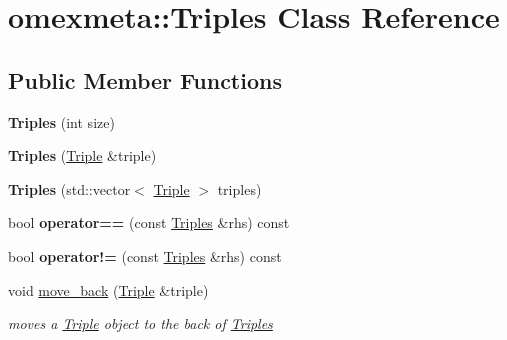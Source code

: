 \hypertarget{classomexmeta_1_1Triples}{}\section{omexmeta\+:\+:Triples Class Reference}
\label{classomexmeta_1_1Triples}
\subsection*{Public Member Functions}
\begin{DoxyCompactItemize}
\item 
\mbox{\label{classomexmeta_1_1Triples_a32ea34c1fd3bfe9887c2221377392efe}} 
{\bfseries Triples} (int size)
\item 
\mbox{\label{classomexmeta_1_1Triples_a733eea0f6a2c206eb96771bc7a8cb430}} 
{\bfseries Triples} (\hyperlink{classomexmeta_1_1Triple}{Triple} \&triple)
\item 
\mbox{\label{classomexmeta_1_1Triples_a71a3ff7b185a5420eabd9bf4e9637196}} 
{\bfseries Triples} (std\+::vector$<$ \hyperlink{classomexmeta_1_1Triple}{Triple} $>$ triples)
\item 
\mbox{\label{classomexmeta_1_1Triples_a8c6e00fe9e694d9c52e1fa37a82ae489}} 
bool {\bfseries operator==} (const \hyperlink{classomexmeta_1_1Triples}{Triples} \&rhs) const
\item 
\mbox{\label{classomexmeta_1_1Triples_a8c9df0d37572179d682127cb7368dd82}} 
bool {\bfseries operator!=} (const \hyperlink{classomexmeta_1_1Triples}{Triples} \&rhs) const
\item 
void \hyperlink{classomexmeta_1_1Triples_a88dcf4b950f105acb621bd07f07a38a0}{move\+\_\+back} (\hyperlink{classomexmeta_1_1Triple}{Triple} \&triple)
\begin{DoxyCompactList}\small\item\em moves a \hyperlink{classomexmeta_1_1Triple}{Triple} object to the back of \hyperlink{classomexmeta_1_1Triples}{Triples} \end{DoxyCompactList}\item 
\mbox{\label{classomexmeta_1_1Triples_a9882f6f582e8d2e34e09d2f7076a0e2e}} 

\end{DoxyCompactItemize}
